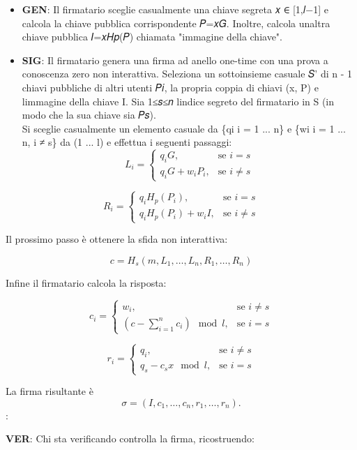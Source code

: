 \documentclass[
]{article}
\providecommand{\tightlist}{%
  \setlength{\itemsep}{0pt}\setlength{\parskip}{0pt}}
\begin{document}
\begin{itemize}
\tightlist
\item
  \textbf{GEN}: Il firmatario sceglie casualmente una chiave segreta 𝑥 ∈
  {[}1,𝑙−1{]} e calcola la chiave pubblica corrispondente 𝑃=𝑥𝐺. Inoltre,
  calcola un\textquotesingle altra chiave pubblica 𝐼=𝑥𝐻𝑝(𝑃) chiamata
  "immagine della chiave".
\item
  \textbf{SIG}: Il firmatario genera una firma ad anello one-time con
  una prova a conoscenza zero non interattiva. Seleziona un sottoinsieme
  casuale 𝑆'\hspace{0pt} di n - 1 chiavi pubbliche di altri utenti 𝑃𝑖,
  la propria coppia di chiavi (x, P) e l\textquotesingle immagine della
  chiave I. Sia 1≤𝑠≤𝑛 l\textquotesingle indice segreto del firmatario in
  S (in modo che la sua chiave sia 𝑃𝑠).\\
  Si sceglie casualmente un elemento casuale da \{qi \textbar{} i = 1
  ... n\} e \{wi \textbar{} i = 1 ... n, i ≠ s\} da (1 ... l) e effettua
  i seguenti passaggi:
  \[ L_i = \begin{cases} q_iG, & \text{se } i = s \\ q_iG+w_iP_i, & \text{se } i \neq s \end{cases} \]
\end{itemize}

\[ R_i = \begin{cases} q_iH_p(P_i), & \text{se } i = s \\ q_iH_p(P_{i})+ w_iI, & \text{se } i \neq s \end{cases} \]

Il prossimo passo è ottenere la sfida non interattiva:

\[ c = H_s(m, L_1, \ldots, L_n, R_1, \ldots, R_n) \]

Infine il firmatario calcola la risposta:

\[ c_i = \begin{cases} w_i, & \text{se } i \neq s \\ \left(c -\sum_{i=1}^{n} c_i\right) \mod l, & \text{se } i = s \end{cases} \]

\[ r_i = \begin{cases} q_i, & \text{se } i \neq s \\ q_s - c_sx \mod l ,& \text{se } i=s \end{cases} \]

La firma risultante è \[ \sigma= (I,c_1,\ldots,c_n,r_1,\ldots,r_n). \]:

\textbf{VER}: Chi sta verificando controlla la firma, ricostruendo:
\end{document}
